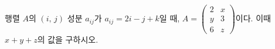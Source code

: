 \hspace*{2mm}\begin{minipage}[t]{\dimexpr\linewidth-2mm\relax}\vspace{0pt}
행렬 $A$의 $(i,\,j)$ 성분 $a_{ij}$가 $a_{ij}=2i-j+k$일 때, $A=\begin{pmatrix} 2 & x \\ y & 3 \\ 6 & z \end{pmatrix}$이다. 이때 $x+y+z$의 값을 구하시오. \end{minipage}

